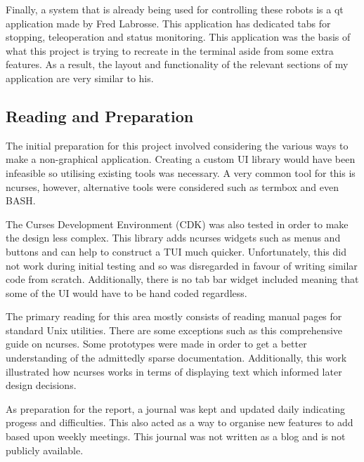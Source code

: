 Finally, a system that is already being used for controlling these robots is a {\selectfont qt} application made by Fred Labrosse. This application has dedicated tabs for stopping, teleoperation and status monitoring. This application was the basis of what this project is trying to recreate in the terminal aside from some extra features. As a result, the layout and functionality of the relevant sections of my application are very similar to his.

\subsection{Reading and Preparation}
\label{reading_and_prep}

The initial preparation for this project involved considering the various ways to make a non-graphical application. Creating a custom UI library would have been infeasible so utilising existing tools was necessary. A very common tool for this is {\selectfont ncurses}\cite{ncurses}, however, alternative tools were considered such as {\selectfont termbox}\cite{termbox} and even {\selectfont BASH}\cite{bash-tui}.

The Curses Development Environment (CDK)\cite{cdk} was also tested in order to make the design less complex. This library adds {\selectfont ncurses} widgets such as menus and buttons and can help to construct a TUI much quicker. Unfortunately, this did not work during initial testing and so was disregarded in favour of writing similar code from scratch. Additionally, there is no tab bar widget included meaning that some of the UI would have to be hand coded regardless.

The primary reading for this area mostly consists of reading manual pages for standard Unix utilities. There are some exceptions such as this comprehensive guide on {\selectfont ncurses}\cite{ncurses-howto}. Some prototypes were made in order to get a better understanding of the admittedly sparse documentation. Additionally, this work illustrated how {\selectfont ncurses} works in terms of displaying text which informed later design decisions.

As preparation for the report, a journal was kept and updated daily indicating progess and difficulties. This also acted as a way to organise new features to add based upon weekly meetings. This journal was not written as a blog and is not publicly available.

